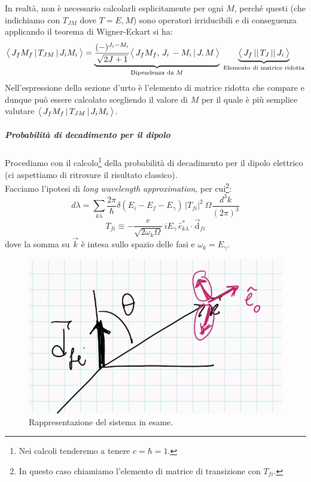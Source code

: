In realtà, non è necessario calcolarli esplicitamente per ogni $M$, perché questi (che indichiamo con $T_{JM}$ dove $T=E,M$) sono operatori irriducibili e di conseguenza applicando il teorema di Wigner-Eckart si ha:
$$\bigl\langle\, J_fM_f\, |\,T_{JM}\, |\,J_iM_i\, \bigr\rangle = \underbrace{\frac{(-)^{J_i-M_i}}{\sqrt{2J+1}}\bigl\langle\, J_fM_f,\,J_i\, -M_i\, |\, J,M\, \bigr\rangle}_{\text{Dipendenza da }M}\; \underbrace{\bigl\langle\, J_f\, ||\,T_J\, ||\,J_i\, \bigr\rangle}_\text{Elemento di matrice ridotta}$$
Nell'espressione della sezione d'urto è l'elemento di matrice ridotta che compare e dunque può essere calcolato scegliendo il valore di $M$ per il quale è più semplice valutare $\bigl\langle\, J_fM_f\, |\,T_{JM}\, |\,J_iM_i\, \bigr\rangle$.

\subparagraph{Probabilità di decadimento per il dipolo} Procediamo con il calcolo\footnote{Nei calcoli tenderemo a tenere $c=\hbar=1$.} della probabilità di decadimento per il dipolo elettrico (ci aspettiamo di ritrovare il risultato classico).\\
Facciamo l'ipotesi di \textit{long wavelength approximation}, per cui\footnote{In questo caso chiamiamo l'elemento di matrice di transizione con $T_{fi}$.}:
$$d\lambda = \sum_{k\lambda} \frac{2\pi}{\hbar} \delta(E_i-E_f-E_\gamma) \,|T_{fi}|^2 \:\Omega \frac{d^3k}{(2\pi)^3}$$
$$T_{fi}\equiv -\frac{e}{\sqrt{2\omega_k \Omega}}\,i E_\gamma \, \hat{e}^*_{k\lambda}\cdot \vec{\mathrm{d}}_{fi}$$
dove la somma su $\vec{k}$ è intesa sullo spazio delle fasi e  $\omega_k = E_\gamma$.
\begin{figure}[h]
    \centering
    \includegraphics[scale=0.2]{Immagini/0310_sistema.png}
    \caption{Rappresentazione del sistema in esame.}
    \label{0310_sist}
\end{figure}
